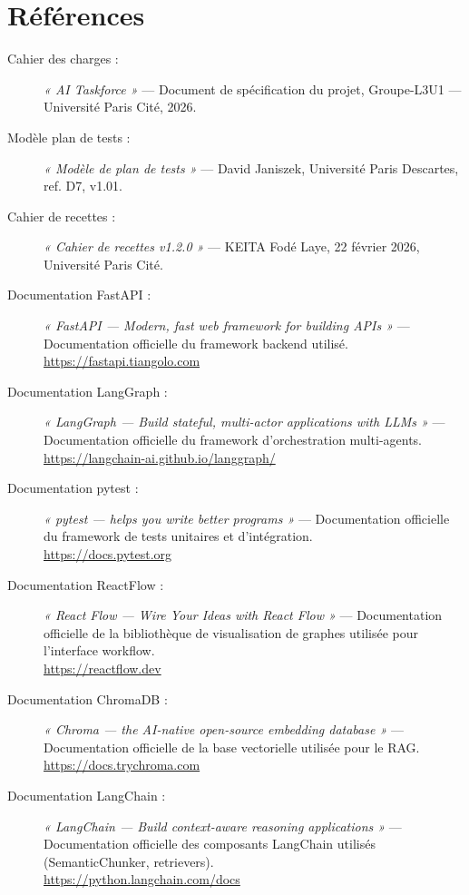 \documentclass[a4paper,11pt]{report}
\begin{document}
\section{Références}

\begin{description}

    \item[Cahier des charges :] \textit{« AI Taskforce »} --- Document de spécification du projet, Groupe-L3U1 --- Université Paris Cité, 2026.

    \item[Modèle plan de tests :] \textit{« Modèle de plan de tests »} --- David Janiszek, Université Paris Descartes, ref. D7, v1.01.

    \item[Cahier de recettes :] \textit{« Cahier de recettes v1.2.0 »} --- KEITA Fodé Laye, 22 février 2026, Université Paris Cité.

    \item[Documentation FastAPI :] \textit{« FastAPI --- Modern, fast web framework for building APIs »} --- Documentation officielle du framework backend utilisé. \\ \url{https://fastapi.tiangolo.com}

    \item[Documentation LangGraph :] \textit{« LangGraph --- Build stateful, multi-actor applications with LLMs »} --- Documentation officielle du framework d'orchestration multi-agents. \\ \url{https://langchain-ai.github.io/langgraph/}

    \item[Documentation pytest :] \textit{« pytest --- helps you write better programs »} --- Documentation officielle du framework de tests unitaires et d'intégration. \\ \url{https://docs.pytest.org}

    \item[Documentation ReactFlow :] \textit{« React Flow --- Wire Your Ideas with React Flow »} --- Documentation officielle de la bibliothèque de visualisation de graphes utilisée pour l'interface workflow. \\ \url{https://reactflow.dev}

    \item[Documentation ChromaDB :] \textit{« Chroma --- the AI-native open-source embedding database »} --- Documentation officielle de la base vectorielle utilisée pour le RAG. \\ \url{https://docs.trychroma.com}

    \item[Documentation LangChain :] \textit{« LangChain --- Build context-aware reasoning applications »} --- Documentation officielle des composants LangChain utilisés (SemanticChunker, retrievers). \\ \url{https://python.langchain.com/docs}

\end{description}
\end{document}
